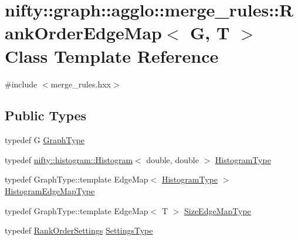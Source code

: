 \hypertarget{classnifty_1_1graph_1_1agglo_1_1merge__rules_1_1RankOrderEdgeMap}{}\section{nifty\+:\+:graph\+:\+:agglo\+:\+:merge\+\_\+rules\+:\+:Rank\+Order\+Edge\+Map$<$ G, T $>$ Class Template Reference}
\label{classnifty_1_1graph_1_1agglo_1_1merge__rules_1_1RankOrderEdgeMap}


{\ttfamily \#include $<$merge\+\_\+rules.\+hxx$>$}

\subsection*{Public Types}
\begin{DoxyCompactItemize}
\item 
typedef G \hyperlink{classnifty_1_1graph_1_1agglo_1_1merge__rules_1_1RankOrderEdgeMap_af6ef0c41c3cbeb666e040e06ebcda4c6}{Graph\+Type}
\item 
typedef \hyperlink{classnifty_1_1histogram_1_1Histogram}{nifty\+::histogram\+::\+Histogram}$<$ double, double $>$ \hyperlink{classnifty_1_1graph_1_1agglo_1_1merge__rules_1_1RankOrderEdgeMap_a83f4d4fcda328512f9d91989e84a655a}{Histogram\+Type}
\item 
typedef Graph\+Type\+::template Edge\+Map$<$ \hyperlink{classnifty_1_1graph_1_1agglo_1_1merge__rules_1_1RankOrderEdgeMap_a83f4d4fcda328512f9d91989e84a655a}{Histogram\+Type} $>$ \hyperlink{classnifty_1_1graph_1_1agglo_1_1merge__rules_1_1RankOrderEdgeMap_ac1bbf5aac0730dfa1d721a7f0d046f99}{Histogram\+Edge\+Map\+Type}
\item 
typedef Graph\+Type\+::template Edge\+Map$<$ T $>$ \hyperlink{classnifty_1_1graph_1_1agglo_1_1merge__rules_1_1RankOrderEdgeMap_a3d289c2deaa4d68cea55486aa10e56dd}{Size\+Edge\+Map\+Type}
\item 
typedef \hyperlink{structnifty_1_1graph_1_1agglo_1_1merge__rules_1_1RankOrderSettings}{Rank\+Order\+Settings} \hyperlink{classnifty_1_1graph_1_1agglo_1_1merge__rules_1_1RankOrderEdgeMap_a6b6c608fd32fef4275091eba71bb6e1a}{Settings\+Type}
\end{DoxyCompactItemize}
